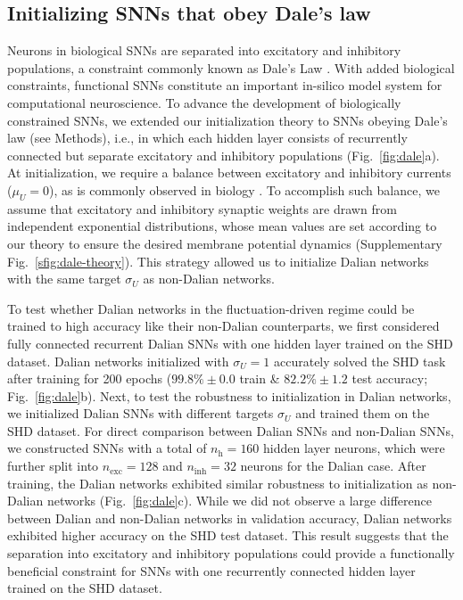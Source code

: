 \documentclass[11pt,a4paper]{article}
\begin{document}
\subsection*{Initializing \acp{SNN} that obey Dale's law}
Neurons in biological \acp{SNN} are separated into excitatory and inhibitory populations, a constraint commonly known as Dale's Law \citep{Eccles1954-td}. 
With added biological constraints, functional \acp{SNN} constitute an important in-silico model system for computational neuroscience.
To advance the development of biologically constrained \acp{SNN}, we extended our initialization theory to \acp{SNN} obeying Dale's law (see Methods), i.e., in which each hidden layer consists of recurrently connected but separate excitatory and inhibitory populations (Fig.~\ref{fig:dale}a). 
At initialization, we require a balance between excitatory and inhibitory currents ($\mu_U = 0$), as is commonly observed in biology \cite{Rupprecht2018-sl,Spiegel2014-ra}.
To accomplish such balance, we assume that excitatory and inhibitory synaptic weights are drawn from independent exponential distributions, whose mean values are set according to our theory to ensure the desired membrane potential dynamics (Supplementary Fig.~\ref{sfig:dale-theory}).
This strategy allowed us to initialize Dalian networks with the same target $\sigma_U$ as non-Dalian networks.

To test whether Dalian networks in the fluctuation-driven regime could be trained to high accuracy like their non-Dalian counterparts, we first considered fully connected recurrent Dalian \acp{SNN} with one hidden layer trained on the SHD dataset.
Dalian networks initialized with $\sigma_U=1$ accurately solved the SHD task after training for 200 epochs ($99.8\%\pm0.0$ train \& $82.2\%\pm1.2$ test accuracy; Fig.~\ref{fig:dale}b). 
Next, to test the robustness to initialization in Dalian networks, we initialized Dalian \acp{SNN} with different targets $\sigma_U$ and trained them on the SHD dataset.
For direct comparison between Dalian \acp{SNN} and non-Dalian \acp{SNN}, we constructed \acp{SNN} with a total of $n_\mathrm{h}=160$ hidden layer neurons, which were further split into $n_\mathrm{exc}=128$ and $n_\mathrm{inh}=32$ neurons for the Dalian case.
After training, the Dalian networks exhibited similar robustness to initialization as non-Dalian networks (Fig.~\ref{fig:dale}c).
While we did not observe a large difference between Dalian and non-Dalian networks in validation accuracy, Dalian networks exhibited higher accuracy on the SHD test dataset.
This result suggests that the separation into excitatory and inhibitory populations could provide a functionally beneficial constraint for \acp{SNN} with one recurrently connected hidden layer trained on the SHD dataset.
\end{document}
